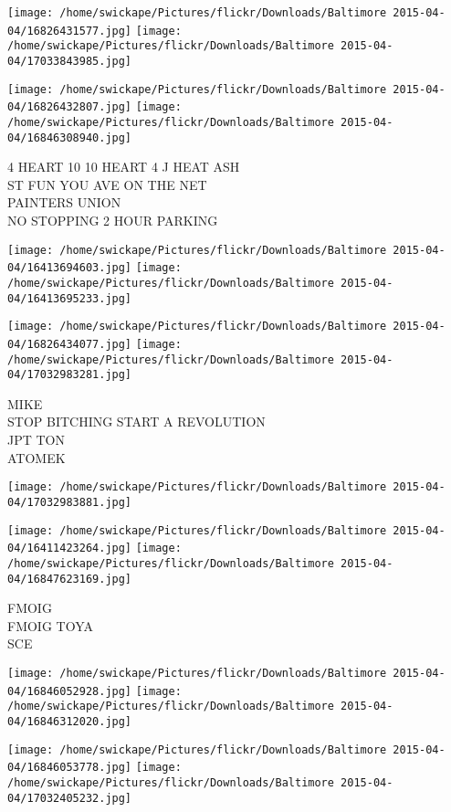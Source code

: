 \documentclass[10pt,letterpaper]{article}
\begin{document}
\texttt{[image: /home/swickape/Pictures/flickr/Downloads/Baltimore 2015-04-04/16826431577.jpg]}
\texttt{[image: /home/swickape/Pictures/flickr/Downloads/Baltimore 2015-04-04/17033843985.jpg]}

\texttt{[image: /home/swickape/Pictures/flickr/Downloads/Baltimore 2015-04-04/16826432807.jpg]}
\texttt{[image: /home/swickape/Pictures/flickr/Downloads/Baltimore 2015-04-04/16846308940.jpg]}

4 HEART 10 10 HEART 4 J HEAT ASH\\
ST FUN YOU AVE ON THE NET\\
PAINTERS UNION\\
NO STOPPING 2 HOUR PARKING\\
\pagebreak

\texttt{[image: /home/swickape/Pictures/flickr/Downloads/Baltimore 2015-04-04/16413694603.jpg]}
\texttt{[image: /home/swickape/Pictures/flickr/Downloads/Baltimore 2015-04-04/16413695233.jpg]}

\texttt{[image: /home/swickape/Pictures/flickr/Downloads/Baltimore 2015-04-04/16826434077.jpg]}
\texttt{[image: /home/swickape/Pictures/flickr/Downloads/Baltimore 2015-04-04/17032983281.jpg]}

MIKE\\
STOP BITCHING START A REVOLUTION\\
JPT TON\\
ATOMEK\\
\pagebreak

\texttt{[image: /home/swickape/Pictures/flickr/Downloads/Baltimore 2015-04-04/17032983881.jpg]}

\vspace{0.25in}
\texttt{[image: /home/swickape/Pictures/flickr/Downloads/Baltimore 2015-04-04/16411423264.jpg]}
\texttt{[image: /home/swickape/Pictures/flickr/Downloads/Baltimore 2015-04-04/16847623169.jpg]}

FMOIG\\
FMOIG TOYA\\
SCE\\
\pagebreak

\texttt{[image: /home/swickape/Pictures/flickr/Downloads/Baltimore 2015-04-04/16846052928.jpg]}
\texttt{[image: /home/swickape/Pictures/flickr/Downloads/Baltimore 2015-04-04/16846312020.jpg]}

\texttt{[image: /home/swickape/Pictures/flickr/Downloads/Baltimore 2015-04-04/16846053778.jpg]}
\texttt{[image: /home/swickape/Pictures/flickr/Downloads/Baltimore 2015-04-04/17032405232.jpg]}
\end{document}
